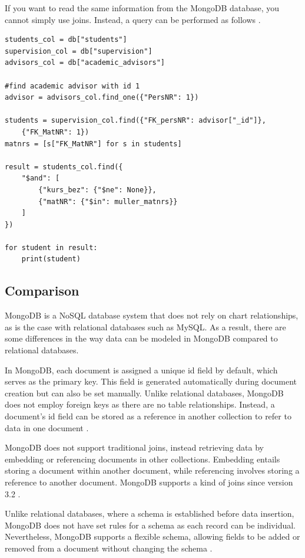 If you want to read the same information from the MongoDB database, you cannot simply use joins. Instead, a query can be performed as follows \parencite{mujdrica_joinsupdate}.

\begin{verbatim}
students_col = db["students"]
supervision_col = db["supervision"]
advisors_col = db["academic_advisors"]

#find academic advisor with id 1
advisor = advisors_col.find_one({"PersNR": 1})

students = supervision_col.find({"FK_persNR": advisor["_id"]}, 
    {"FK_MatNR": 1})
matnrs = [s["FK_MatNR"] for s in students]

result = students_col.find({
    "$and": [
        {"kurs_bez": {"$ne": None}},
        {"matNR": {"$in": muller_matnrs}}
    ]
})

for student in result:
    print(student)
\end{verbatim}

\subsection{Comparison}

MongoDB is a \ac{NoSQL} database system that does not rely on chart relationships, as is the case with relational databases such as MySQL. As a result, there are some differences in the way data can be modeled in MongoDB compared to relational databases.

In MongoDB, each document is assigned a unique id field by default, which serves as the primary key. This field is generated automatically during document creation but can also be set manually. Unlike relational databases, MongoDB does not employ foreign keys as there are no table relationships. Instead, a document's id field can be stored as a reference in another collection to refer to data in one document \parencite{mujdrica_comparison}.

MongoDB does not support traditional joins, instead retrieving data by embedding or referencing documents in other collections. Embedding entails storing a document within another document, while referencing involves storing a reference to another document. MongoDB supports a kind of joins since version 3.2 \parencite{mujdrica_comparison, mujdrica_joinsupdate}.

Unlike relational databases, where a schema is established before data insertion, MongoDB does not have set rules for a schema as each record can be individual. Nevertheless, MongoDB supports a flexible schema, allowing fields to be added or removed from a document without changing the schema \parencite{mujdrica_comparison}.

